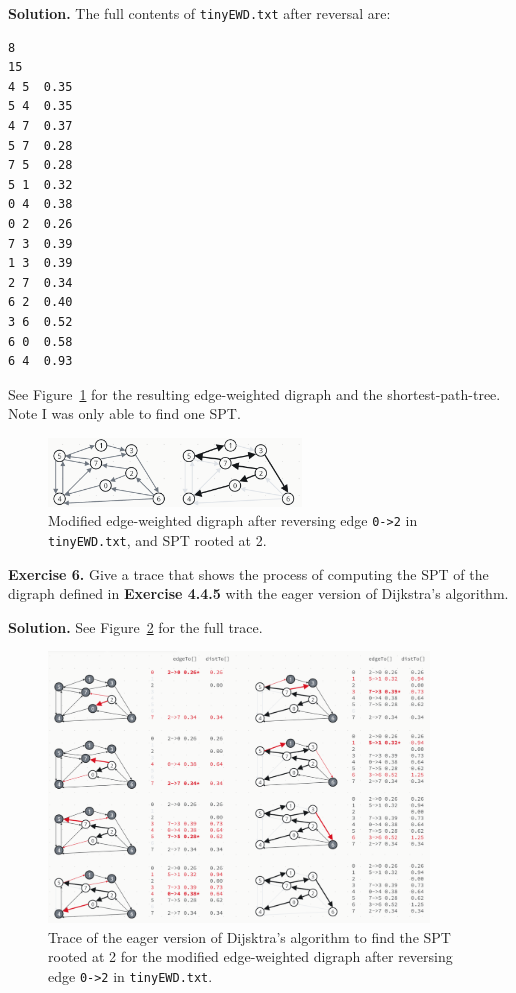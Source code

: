 \documentclass[12pt, a4paper]{article}
\newenvironment{ex}[2][Exercise]
{\par\medskip\noindent \textbf{#1 #2.}}
{\medskip}
\newenvironment{sol}[1][Solution]
{\par\medskip\noindent \textbf{#1.} }
{\medskip}
\begin{document}
	\begin{sol}
		The full contents of \texttt{tinyEWD.txt} after reversal are:
		\begin{lstlisting}[language={}]
8
15
4 5  0.35
5 4  0.35
4 7  0.37
5 7  0.28
7 5  0.28
5 1  0.32
0 4  0.38
0 2  0.26
7 3  0.39
1 3  0.39
2 7  0.34
6 2  0.40
3 6  0.52
6 0  0.58
6 4  0.93
		\end{lstlisting}
		See Figure~\ref{fig:ex-05} for the resulting edge-weighted digraph and the
		shortest-path-tree. Note I was only able to find one SPT.
		\begin{figure}
			\centering
			\includegraphics[width=0.6\textwidth]{exercise-05}
			\caption{Modified edge-weighted digraph after reversing edge \texttt{0->2}
			in \texttt{tinyEWD.txt}, and SPT rooted at 2.}
			\label{fig:ex-05}
		\end{figure}
	\end{sol}
	\begin{ex}{6}
		Give a trace that shows the process of computing the SPT of the digraph defined
		in \textbf{Exercise 4.4.5} with the eager version of Dijkstra's algorithm.
	\end{ex}
	\begin{sol}
		See Figure~\ref{fig:ex-06} for the full trace.
		\begin{figure}
			\centering
			\includegraphics[width=0.9\textwidth]{exercise-06}
			\caption{Trace of the eager version of Dijsktra's algorithm to find the SPT
				rooted at 2 for the modified edge-weighted digraph after reversing edge
				\texttt{0->2} in \texttt{tinyEWD.txt}.}
			\label{fig:ex-06}
		\end{figure}
	\end{sol}
\end{document}
